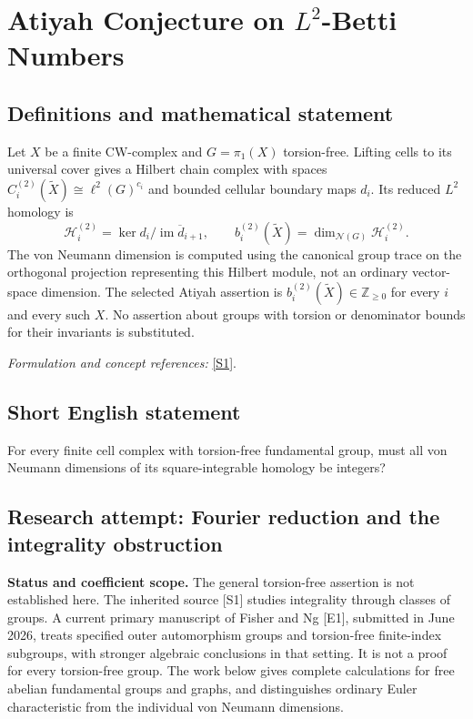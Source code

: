 \documentclass[11pt]{article}
\begin{document}
\section*{\texorpdfstring{Atiyah Conjecture on $L^2$-Betti Numbers}{Atiyah Conjecture on \$L\textasciicircum{}2\$-Betti Numbers}}\label{statement}
\subsection{Definitions and mathematical statement}
Let $X$ be a finite CW-complex and $G=\pi_1(X)$ torsion-free. Lifting cells to its universal cover gives a Hilbert chain complex with spaces $C_i^{(2)}(\widetilde X)\cong\ell^2(G)^{c_i}$ and bounded cellular boundary maps $d_i$. Its reduced $L^2$ homology is
\[
 \mathcal H_i^{(2)}=\ker d_i\big/\overline{\operatorname{im}d_{i+1}},
 \qquad b_i^{(2)}(\widetilde X)=\dim_{\mathcal N(G)}\mathcal H_i^{(2)}.
\]
The von Neumann dimension is computed using the canonical group trace on the orthogonal projection representing this Hilbert module, not an ordinary vector-space dimension. The selected Atiyah assertion is $b_i^{(2)}(\widetilde X)\in{\mathbb{Z}}_{\ge0}$ for every $i$ and every such $X$. No assertion about groups with torsion or denominator bounds for their invariants is substituted.
\par\smallskip\textit{Formulation and concept references:} \href{https://arxiv.org/abs/math/0001101}{[S1]}.

\subsection{Short English statement}
For every finite cell complex with torsion-free fundamental group, must all von Neumann dimensions of its square-integrable homology be integers?
\subsection{Research attempt: Fourier reduction and the integrality obstruction}
\textbf{Status and coefficient scope.} The general torsion-free assertion is not established here. The inherited source [S1] studies integrality through classes of groups. A current primary manuscript of Fisher and Ng [E1], submitted in June 2026, treats specified outer automorphism groups and torsion-free finite-index subgroups, with stronger algebraic conclusions in that setting. It is not a proof for every torsion-free group. The work below gives complete calculations for free abelian fundamental groups and graphs, and distinguishes ordinary Euler characteristic from the individual von Neumann dimensions.
\end{document}
